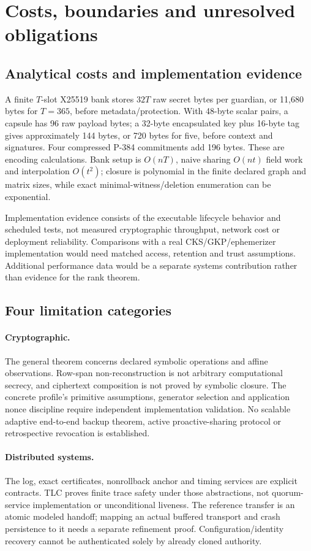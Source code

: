 \documentclass[pdflatex,sn-mathphys-num]{sn-jnl}
\theoremstyle{plain}
\theoremstyle{definition}
\begin{document}
\section{Costs, boundaries and unresolved obligations}\label{sec:limits}

\subsection{Analytical costs and implementation evidence}
A finite $T$-slot X25519 bank stores $32T$ raw secret bytes per guardian, or 11,680 bytes for $T=365$, before metadata/protection. With 48-byte scalar pairs, a capsule has 96 raw payload bytes; a 32-byte encapsulated key plus 16-byte tag gives approximately 144 bytes, or 720 bytes for five, before context and signatures. Four compressed P-384 commitments add 196 bytes. These are encoding calculations. Bank setup is $O(nT)$, naive sharing $O(nt)$ field work and interpolation $O(t^2)$; closure is polynomial in the finite declared graph and matrix sizes, while exact minimal-witness/deletion enumeration can be exponential.

Implementation evidence consists of the executable lifecycle behavior and scheduled tests, not measured cryptographic throughput, network cost or deployment reliability. Comparisons with a real CKS/GKP/ephemerizer implementation would need matched access, retention and trust assumptions. Additional performance data would be a separate systems contribution rather than evidence for the rank theorem.

\subsection{Four limitation categories}
\paragraph{Cryptographic.}
The general theorem concerns declared symbolic operations and affine observations. Row-span non-reconstruction is not arbitrary computational secrecy, and ciphertext composition is not proved by symbolic closure. The concrete profile's primitive assumptions, generator selection and application nonce discipline require independent implementation validation. No scalable adaptive end-to-end backup theorem, active proactive-sharing protocol or retrospective revocation is established.

\paragraph{Distributed systems.}
The log, exact certificates, nonrollback anchor and timing services are explicit contracts. TLC proves finite trace safety under those abstractions, not quorum-service implementation or unconditional liveness. The reference transfer is an atomic modeled handoff; mapping an actual buffered transport and crash persistence to it needs a separate refinement proof. Configuration/identity recovery cannot be authenticated solely by already cloned authority.
\end{document}
